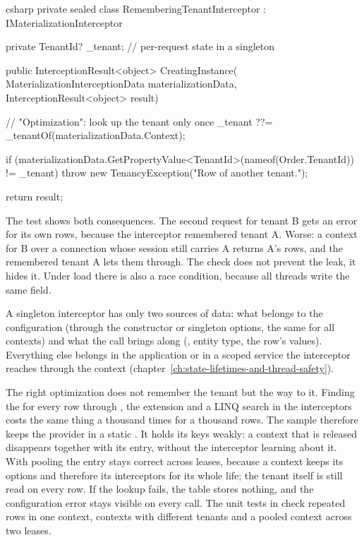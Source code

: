 \begin{sourcecode}{csharp}
private sealed class RememberingTenantInterceptor : IMaterializationInterceptor
{
    private TenantId? _tenant;                       // per-request state in a singleton

    public InterceptionResult<object> CreatingInstance(
        MaterializationInterceptionData materializationData,
        InterceptionResult<object> result)
    {
        // "Optimization": look up the tenant only once
        _tenant ??= _tenantOf(materializationData.Context);

        if (materializationData.GetPropertyValue<TenantId>(nameof(Order.TenantId)) != _tenant)
            throw new TenancyException("Row of another tenant.");

        return result;
    }
}
\end{sourcecode}

The test shows both consequences. The second request for tenant B gets an error for its own
rows, because the interceptor remembered tenant A. Worse: a context for B over a connection
whose session still carries A returns A's rows, and the remembered tenant A lets them
through. The check does not prevent the leak, it hides it. Under load there is also a race
condition, because all threads write the same field.

\begin{tip}
  A singleton interceptor has only two sources of data: what belongs to the configuration
  (through the constructor or singleton options, the same for all contexts) and what the call
  brings along (, entity type, the row's values). Everything else belongs in
  the application or in a scoped service the interceptor reaches through the context
  (chapter~\ref{ch:state-lifetimes-and-thread-safety}).
\end{tip}

The right optimization does not remember the tenant but the way to it. Finding the
 for every row through
, the
extension and a LINQ search in the interceptors costs the same thing a thousand times for a
thousand rows. The sample therefore keeps the provider in a static
. It holds its keys weakly: a context that is released disappears
together with its entry, without the interceptor learning about it. With pooling the entry stays
correct across leases, because a context keeps its options and therefore its interceptors for
its whole life; the tenant itself is still read on every row. If the lookup fails, the table
stores nothing, and the configuration error stays visible on every call.
The unit tests in  check repeated rows in one
context, contexts with different tenants and a pooled context across two leases.

